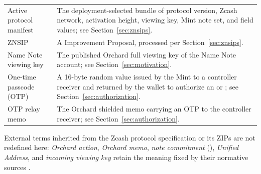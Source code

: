 \begin{center}
\begin{tabularx}{\textwidth}{@{}L{0.28\textwidth}Y@{}}
Active protocol manifest & The deployment-selected bundle of protocol version, Zcash network, activation height, viewing key, Mint note set, and field values; see Section~\ref{sec:znsips}. \\
ZNSIP & A \zns{} Improvement Proposal, processed per Section~\ref{sec:znsips}. \\
Name Note viewing key & The published Orchard full viewing key of the Name Note account; see Section~\ref{sec:motivation}. \\
One-time passcode (OTP) & A 16-byte random value issued by the Mint to a controller receiver and returned by the wallet to authorize an  or ; see Section~\ref{sec:authorization}. \\
OTP relay memo & The Orchard shielded memo  carrying an OTP to the controller receiver; see Section~\ref{sec:authorization}. \\
\bottomrule
\end{tabularx}
\end{center}

External terms inherited from the Zcash protocol specification \cite{zcash-protocol} or its ZIPs are not redefined here: \emph{Orchard action}, \emph{Orchard memo}, \emph{note commitment} (), \emph{Unified Address}, and \emph{incoming viewing key} retain the meaning fixed by their normative sources \cite{zip224,zip316,zcash-protocol}.